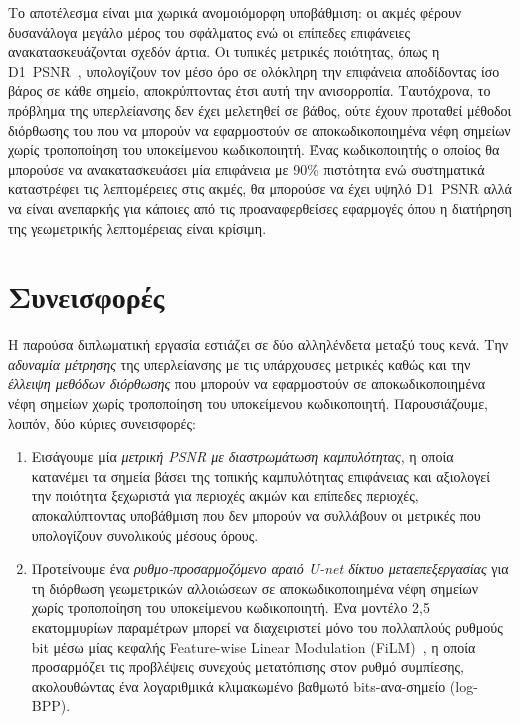 Το αποτέλεσμα είναι μια χωρικά ανομοιόμορφη υποβάθμιση: οι ακμές φέρουν δυσανάλογα μεγάλο μέρος του σφάλματος ενώ οι επίπεδες επιφάνειες ανακατασκευάζονται σχεδόν άρτια.
Οι τυπικές μετρικές ποιότητας, όπως η D1~PSNR~\cite{tian2017geometric}, υπολογίζουν τον μέσο όρο σε ολόκληρη την επιφάνεια αποδίδοντας ίσο βάρος σε κάθε σημείο, αποκρύπτοντας έτσι αυτή την ανισορροπία.
Ταυτόχρονα, το πρόβλημα της υπερλείανσης δεν έχει μελετηθεί σε βάθος, ούτε έχουν προταθεί μέθοδοι διόρθωσης του που να μπορούν να εφαρμοστούν σε
αποκωδικοποιημένα νέφη σημείων χωρίς τροποποίηση του υποκείμενου κωδικοποιητή.
Ένας κωδικοποιητής ο οποίος θα μπορούσε να ανακατασκευάσει μία επιφάνεια με 90\% πιστότητα ενώ συστηματικά καταστρέφει τις λεπτομέρειες στις ακμές, θα μπορούσε να
έχει υψηλό D1~PSNR αλλά να είναι ανεπαρκής για κάποιες από τις προαναφερθείσες εφαρμογές όπου η διατήρηση της γεωμετρικής λεπτομέρειας είναι κρίσιμη.

\section{Συνεισφορές}
Η παρούσα διπλωματική εργασία εστιάζει σε δύο αλληλένδετα μεταξύ τους κενά. Την \emph{αδυναμία μέτρησης} της υπερλείανσης με τις υπάρχουσες μετρικές καθώς και την
\emph{έλλειψη μεθόδων διόρθωσης} που μπορούν να εφαρμοστούν σε αποκωδικοποιημένα νέφη σημείων χωρίς τροποποίηση του υποκείμενου κωδικοποιητή.
Παρουσιάζουμε, λοιπόν, δύο κύριες συνεισφορές:

\begin{enumerate}
  \item Εισάγουμε μία \emph{μετρική PSNR με διαστρωμάτωση καμπυλότητας}, η οποία κατανέμει τα σημεία βάσει της τοπικής καμπυλότητας επιφάνειας και
  αξιολογεί την ποιότητα ξεχωριστά για περιοχές ακμών και επίπεδες περιοχές, αποκαλύπτοντας υποβάθμιση που δεν μπορούν να συλλάβουν οι μετρικές που υπολογίζουν συνολικούς μέσους όρους.
  \item Προτείνουμε ένα \emph{ρυθμο-προσαρμοζόμενο αραιό U-net δίκτυο μεταεπεξεργασίας} για τη διόρθωση γεωμετρικών αλλοιώσεων σε
  αποκωδικοποιημένα νέφη σημείων χωρίς τροποποίηση του υποκείμενου κωδικοποιητή. Ένα μοντέλο 2,5 εκατομμυρίων παραμέτρων μπορεί να διαχειριστεί μόνο του πολλαπλούς ρυθμούς bit μέσω μίας κεφαλής Feature-wise Linear Modulation (FiLM)~\cite{perez2018film}, η οποία προσαρμόζει τις προβλέψεις συνεχούς μετατόπισης στον ρυθμό συμπίεσης, ακολουθώντας ένα λογαριθμικά κλιμακωμένο βαθμωτό bits-ανα-σημείο (log-BPP).
\end{enumerate}

